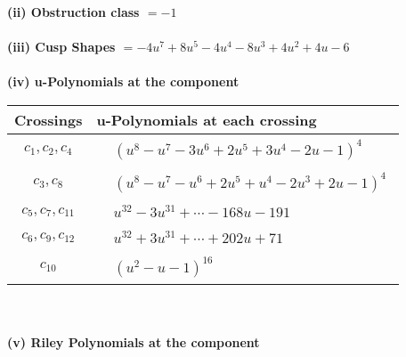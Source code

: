 \documentclass[1p]{elsarticle_modified}
\theoremstyle{definition}
\begin{document}
\flushleft \textbf{(ii) Obstruction class $= -1$}\\~\\
\flushleft \textbf{(iii) Cusp Shapes $= -4 u^7+8 u^5-4 u^4-8 u^3+4 u^2+4 u-6$}\\~\\
\newpage\renewcommand{\arraystretch}{1}
\flushleft \textbf{(iv) u-Polynomials at the component}\newline \\
\begin{tabular}{m{50pt}|m{274pt}}
Crossings & \hspace{64pt}u-Polynomials at each crossing \\
\hline $$\begin{aligned}c_{1},c_{2},c_{4}\end{aligned}$$&$\begin{aligned}
&(u^8- u^7-3 u^6+2 u^5+3 u^4-2 u-1)^4
\end{aligned}$\\
\hline $$\begin{aligned}c_{3},c_{8}\end{aligned}$$&$\begin{aligned}
&(u^8- u^7- u^6+2 u^5+u^4-2 u^3+2 u-1)^4
\end{aligned}$\\
\hline $$\begin{aligned}c_{5},c_{7},c_{11}\end{aligned}$$&$\begin{aligned}
&u^{32}-3 u^{31}+\cdots-168 u-191
\end{aligned}$\\
\hline $$\begin{aligned}c_{6},c_{9},c_{12}\end{aligned}$$&$\begin{aligned}
&u^{32}+3 u^{31}+\cdots+202 u+71
\end{aligned}$\\
\hline $$\begin{aligned}c_{10}\end{aligned}$$&$\begin{aligned}
&(u^2- u-1)^{16}
\end{aligned}$\\
\hline
\end{tabular}\\~\\
\newpage\renewcommand{\arraystretch}{1}
\flushleft \textbf{(v) Riley Polynomials at the component}\newline \\
\end{document}
